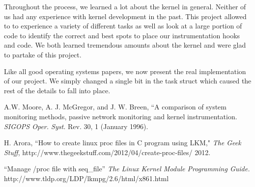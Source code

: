 \documentclass[conference]{IEEEtran}
\begin{document}
Throughout the process, we learned a lot about the kernel in general.
Neither of us had any experience with kernel development in the past.
This project allowed to to experience a variety of different tasks as well as look at a large portion of code to identify the correct and best spots to place our instrumentation hooks and code.
We both learned tremendous amounts about the kernel and were glad to partake of this project.

Like all good operating systems papers, we now present the real implementation of our project.
We simply changed a single bit in the task struct which caused the rest of the details to fall into place.



%
%
%


\def\V{\rm vol.~}
\def\N{no.~}
\def\pp{pp.~}
\def\Pot{\it Proc. }
\def\IJCNN{\it International Joint Conference on Neural Networks\rm }
\def\ACC{\it American Control Conference\rm }
\def\SMC{\it IEEE Trans. Systems\rm , \it Man\rm , and \it Cybernetics\rm }

\def\handb{ \it Handbook of Intelligent Control: Neural\rm , \it
    Fuzzy\rm , \it and Adaptive Approaches \rm }

\begin{thebibliography}{1}
 A.W. Moore, A. J. McGregor, and J. W. Breen,
        ``A comparison of system monitoring methods, passive network monitoring and kernel instrumentation.
        {\it SIGOPS Oper. Syst.} Rev. 30, 1 (January 1996).

 H. Arora, ``How to create linux proc files in C program using LKM,"
        {\it The Geek Stuff}, http://www.thegeekstuff.com/2012/04/create-proc-files/ 2012.

 ``Manage /proc file with seq\_file''
	{\it The Linux Kernel Module Programming Guide.}
        http://www.tldp.org/LDP/lkmpg/2.6/html/x861.html

\end{thebibliography}

\end{document}
